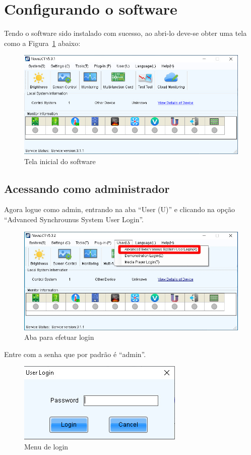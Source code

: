 \documentclass[12pt, a4paper]{article}
\begin{document}
\section{Configurando o software}\label{Configurando o software}
Tendo o software sido instalado com sucesso, ao abri-lo deve-se obter uma tela como a Figura~\ref{fig:CS1.jpeg} abaixo:
\begin{figure}[!htb]
	\centering
	\includegraphics[width=\textwidth]{CS1.jpeg}
	\caption{\label{fig:CS1.jpeg}Tela inicial do software}
\end{figure}

\newpage
\subsection{Acessando como administrador}\label{Acessando como administrador}
Agora logue como admin, entrando na aba ``User (U)'' e clicando na opção ``Advanced Synchrounus System User Login''.
\begin{figure}[!htb]
	\centering
	\includegraphics[width=\textwidth]{CS2.jpeg}
	\caption{\label{fig:CS2.jpeg}Aba para efetuar login}
\end{figure}

\vfill
Entre com a senha que por padrão é ``admin''.
\begin{figure}[!htb]
	\centering
	\includegraphics[width=.6\textwidth]{CS3.jpeg}
	\caption{\label{fig:CS3.jpeg}Menu de login}
\end{figure}
\end{document}
